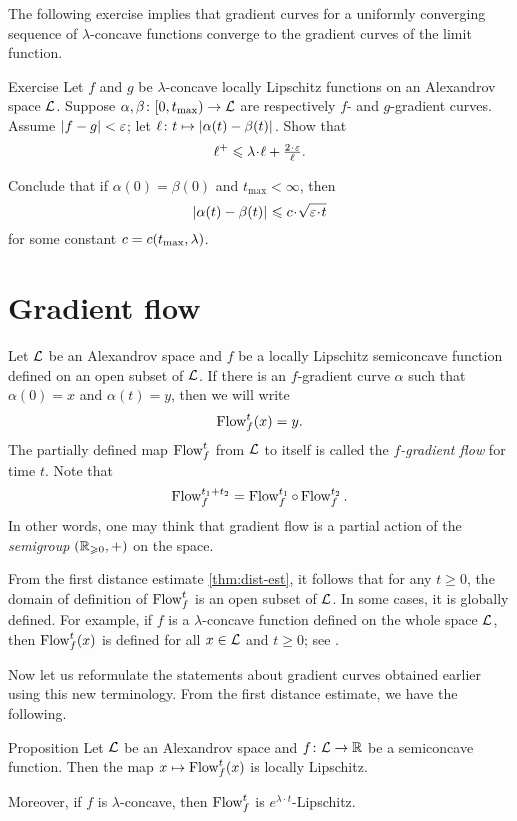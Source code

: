 The following exercise implies that gradient curves for a uniformly converging sequence of $\lambda$-concave functions converge to the gradient curves of the limit function.

\begin{thm}{Exercise}\label{lem:fg-dist-est}
Let $f$ and $g$ be $\lambda$-concave locally Lipschitz functions on an Alexandrov space $\mathcal{L}$.
Suppose
$\alpha,\beta\colon[0,t_{\max})\to \mathcal{L}$ are respectively $f$- and $g$-gradient curves.
Assume $|f-g|<\varepsilon$; let $\ell\:t\mapsto\dist{\alpha(t)}{\beta(t)}{}$.
Show that
\[\ell^+\le \lambda\cdot\ell+\tfrac{2\cdot\eps}{\ell}.\]

Conclude that if $\alpha(0)=\beta(0)$ and $t_{\max}<\infty$, then
\[\dist{\alpha(t)}{\beta(t)}{}
\le
\Const\cdot\sqrt{\eps\cdot t}\]
for some constant $c=c(t_{\max},\lambda)$.
\end{thm}

\section{Gradient flow}

Let $\mathcal{L}$ be an Alexandrov space 
and $f$ be a locally Lipschitz semiconcave function defined on an open subset of $\mathcal{L}$.
If there is an $f$-gradient curve $\alpha$ such that $\alpha(0)=x$ and $\alpha(t)=y$,
then we will write 
\[\mathop{\rm Flow}\nolimits^t_f(x)=y.\]
The partially defined map $\mathop{\rm Flow}\nolimits^t_f$ from $\mathcal{L}$ to itself is called the \emph{$f$-gradient flow} for time $t$.
Note that
\[\mathop{\rm Flow}\nolimits^{t_1+t_2}_f=\mathop{\rm Flow}\nolimits_f^{t_1}\circ\mathop{\rm Flow}\nolimits_f^{t_2}.\]
In other words, one may think that gradient flow is a partial action of the \textit{semigroup} $(\mathbb{R}_{\geqslant0},+)$ on the space.
 
From the first distance estimate \ref{thm:dist-est}, 
it follows that for any $t\ge 0$, the domain of definition of $\mathop{\rm Flow}\nolimits^t_f$ is an open subset of $\mathcal{L}$.
In some cases, it is globally defined.
For example, if $f$ is a $\lambda$-concave function defined on the whole space $\mathcal{L}$, then $\mathop{\rm Flow}\nolimits^t_f(x)$ is defined for all $x\in \mathcal{L}$ and $t\ge0$;
see \cite[16.19]{alexander-kapovitch-petrunin2024}.

Now let us reformulate the statements about gradient curves obtained earlier using this new terminology.
From the first distance estimate, we have the following.

\begin{thm}{Proposition}\label{prop:GF-is-lip}
Let $\mathcal{L}$ be an Alexandrov space 
and $f\colon\mathcal{L}\to \mathbb{R}$ be a semiconcave function.
Then the map $x\mapsto\mathop{\rm Flow}\nolimits^t_f(x)$ is locally Lipschitz.

Moreover, if $f$ is $\lambda$-concave, then $\mathop{\rm Flow}\nolimits^t_f$ is $e^{\lambda\cdot t}$-Lipschitz.
\end{thm}


